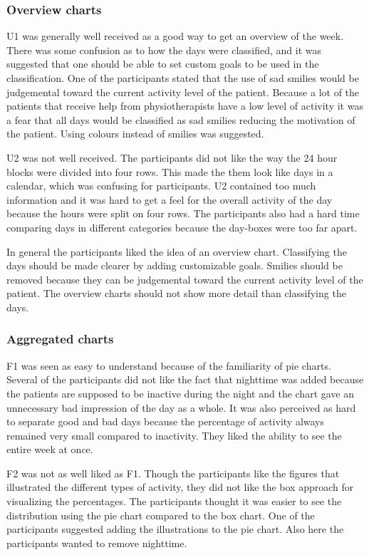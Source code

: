 \subsubsection{Overview charts}
U1 was generally well received as a good way to get an overview of the week. There was some confusion as to how the days were classified, and it was suggested that one should be able to set custom goals to be used in the classification. One of the participants stated that the use of sad smilies would be judgemental toward the current activity level of the patient. Because a lot of the patients that receive help from physiotherapists have a low level of activity it was a fear that all days would be classified as sad smilies reducing the motivation of the patient. Using colours instead of smilies was suggested.

U2 was not well received. The participants did not like the way the 24 hour blocks were divided into four rows. This made the them look like days in a calendar, which was confusing for participants. U2 contained too much information and it was hard to get a feel for the overall activity of the day because the hours were split on four rows. The participants also had a hard time comparing days in different categories because the day-boxes were too far apart.

In general the participants liked the idea of an overview chart. Classifying the days should be made clearer by adding customizable goals. Smilies should be removed because they can be judgemental toward the current activity level of the patient. The overview charts should not show more detail than classifying the days.

\subsubsection{Aggregated charts}
F1 was seen as easy to understand because of the familiarity of pie charts. Several of the participants did not like the fact that nighttime was added because the patients are supposed to be inactive during the night and the chart gave an unnecessary bad impression of the day as a whole. It was also perceived as hard to separate good and bad days because the percentage of activity always remained very small compared to inactivity. They liked the ability to see the entire week at once.

F2 was not as well liked as F1. Though the participants like the figures that illustrated the different types of activity, they did not like the box approach for visualizing the percentages. The participants thought it was easier to see the distribution using the pie chart compared to the box chart. One of the participants suggested adding the illustrations to the pie chart. Also here the participants wanted to remove nighttime.

